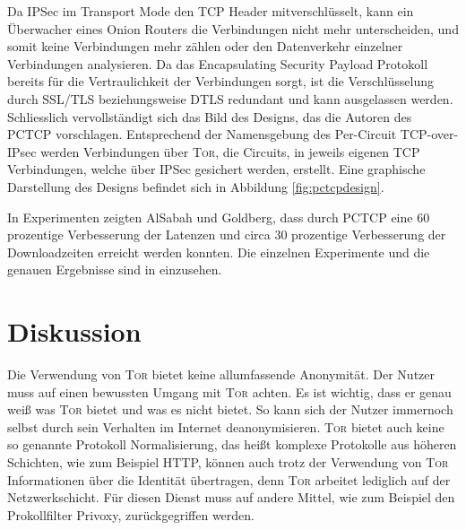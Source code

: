 \documentclass[fleqn,envcountsame,runningheads,10pt,a4paper]{llncs}
\begin{document}
Da IPSec im Transport Mode den TCP Header mitverschlüsselt, kann ein Überwacher eines Onion Routers die Verbindungen nicht mehr unterscheiden, und somit keine Verbindungen mehr zählen oder den Datenverkehr einzelner Verbindungen analysieren. Da das Encapsulating Security Payload Protokoll bereits für die Vertraulichkeit der Verbindungen sorgt, ist die Verschlüsselung durch SSL/TLS beziehungsweise DTLS redundant und kann ausgelassen werden. Schliesslich vervollständigt sich das Bild des Designs, das die Autoren des PCTCP vorschlagen. Entsprechend der Namensgebung des Per-Circuit TCP-over-IPsec werden Verbindungen über \textsc{Tor}, die Circuits, in jeweils eigenen TCP Verbindungen, welche über IPSec gesichert werden, erstellt. Eine graphische Darstellung des Designs befindet sich in Abbildung \ref{fig:pctcpdesign}.

In Experimenten zeigten AlSabah und Goldberg, dass durch PCTCP eine 60 prozentige Verbesserung der Latenzen und circa 30 prozentige Verbesserung der Downloadzeiten erreicht werden konnten. Die einzelnen Experimente und die genauen Ergebnisse sind in \cite{pctcp} einzusehen.



\section{Diskussion}
\label{sec:discussion}

Die Verwendung von \textsc{Tor} bietet keine allumfassende Anonymität. Der Nutzer muss auf einen bewussten Umgang mit \textsc{Tor} achten. Es ist wichtig, dass er genau weiß was \textsc{Tor} bietet und was es nicht bietet. So kann sich der Nutzer immernoch selbst durch sein Verhalten im Internet deanonymisieren. \textsc{Tor} bietet auch keine so genannte Protokoll Normalisierung, das heißt komplexe Protokolle aus höheren Schichten, wie zum Beispiel HTTP, können auch trotz der Verwendung von \textsc{Tor} Informationen über die Identität übertragen, denn \textsc{Tor} arbeitet lediglich auf der Netzwerkschicht. Für diesen Dienst muss auf andere Mittel, wie zum Beispiel den Prokollfilter Privoxy, zurückgegriffen werden.
\end{document}
